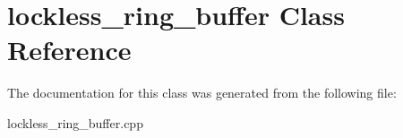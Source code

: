 \hypertarget{classlockless__ring__buffer}{}\section{lockless\+\_\+ring\+\_\+buffer Class Reference}
\label{classlockless__ring__buffer}


The documentation for this class was generated from the following file\+:\begin{DoxyCompactItemize}
\item 
lockless\+\_\+ring\+\_\+buffer.\+cpp\end{DoxyCompactItemize}

